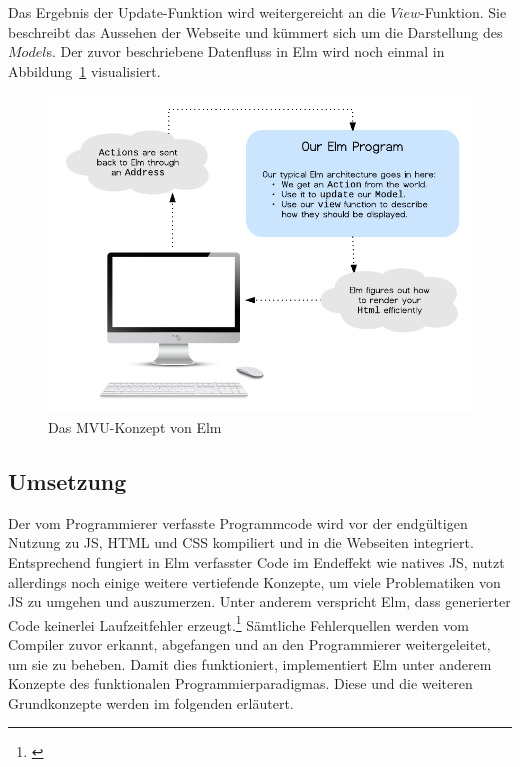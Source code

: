 Das Ergebnis der Update-Funktion wird weitergereicht an die $View$-Funktion. Sie beschreibt das Aussehen der Webseite und kümmert sich um die Darstellung des $Model$s.
Der zuvor beschriebene Datenfluss in Elm wird noch einmal in Abbildung~\ref{fig:elm-model-view-update-concept} visualisiert.
\begin{figure}[h]
  \centering  
  \includegraphics[scale=1]{img/elm-model-view-update-concept.png}
  \caption{Das \ac{MVU}-Konzept von Elm \cite{elm-model-update-view}}\label{fig:elm-model-view-update-concept}
\end{figure}

\subsection{Umsetzung}
\label{sec:Umsetzung}
Der vom Programmierer verfasste Programmcode wird vor der endgültigen Nutzung zu \ac{JS}, \ac{HTML} und \ac{CSS} kompiliert und in die Webseiten integriert. Entsprechend fungiert in Elm verfasster Code im Endeffekt wie natives \acf{JS}, nutzt allerdings noch einige weitere vertiefende Konzepte, um viele Problematiken von \ac{JS} zu umgehen und auszumerzen.
Unter anderem verspricht Elm, dass generierter Code keinerlei Laufzeitfehler erzeugt.\footnote{\cite[Vgl.]{elm-no-runtime-errors}} Sämtliche Fehlerquellen werden vom Compiler zuvor erkannt, abgefangen und an den Programmierer weitergeleitet, um sie zu beheben. Damit dies funktioniert, implementiert Elm unter anderem Konzepte des funktionalen Programmierparadigmas. Diese und die weiteren Grundkonzepte werden im folgenden erläutert.

